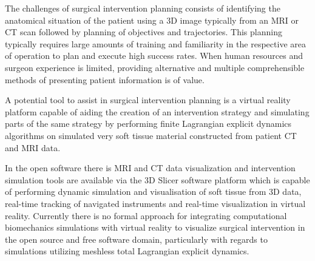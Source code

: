 



The challenges of surgical intervention planning consists of identifying the anatomical situation of the patient using a 3D image typically from an MRI or CT scan followed by planning of objectives and trajectories. This planning typically requires large amounts of training and familiarity in the respective area of operation to plan and execute high success rates. When human resources and surgeon experience is limited, providing alternative and multiple comprehensible methods of presenting patient information is of value.


A potential tool to assist in surgical intervention planning is a virtual reality platform capable of aiding the creation of an intervention strategy and simulating parts of the same strategy by performing finite Lagrangian explicit dynamics algorithms on simulated very soft tissue material constructed from patient CT and MRI data.



In the open software there is MRI and CT data visualization and intervention simulation tools are available via the 3D Slicer software platform which is capable of performing dynamic simulation and visualisation of soft tissue from 3D data, real-time tracking of navigated instruments \cite{Ungi2016} and real-time visualization in virtual reality.
Currently there is no formal approach for integrating computational biomechanics simulations with virtual reality to visualize surgical intervention in the open source and free software domain, particularly with regards to simulations utilizing meshless total Lagrangian explicit dynamics.

